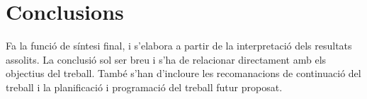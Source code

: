 \chapter{Conclusions}

Fa la funció de síntesi final, i s’elabora a partir de la interpretació dels resultats assolits. La conclusió sol ser breu i s’ha de relacionar directament amb els objectius del treball. 
També s’han d’incloure les recomanacions de continuació del treball i la planificació i programació del treball futur proposat.
